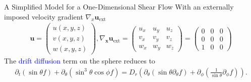 \begin{frame}{A Simplified Model for a One-Dimensional Shear Flow}
	\scriptsize
	With an externally imposed velocity gradient $\nabla_x \boldsymbol{u}_{\mathrm{ext}}$
	\begin{align*}
		\boldsymbol{u}=\left(\begin{array}{l}
			u(x,y,z) \\
			v(x,y,z) \\
			w(x,y,z)
		\end{array}\right),
		\nabla_{\boldsymbol{x}} \boldsymbol{u}_{\mathrm{ext}}=\left(\begin{array}{lll}
			u_{x} & u_{y} & u_{z} \\
			v_{x} & v_{y} & v_{z} \\
			w_{x} & w_{y} & w_{z}
		\end{array}\right)=\left(\begin{array}{ccc}
			0 & 0 & 0 \\
			0 & 0 & 0 \\
			1 & 0 & 0
		\end{array}\right)
	\end{align*}
   The \textcolor{blue}{drift diffusion} term on the sphere reduces to
    \begin{align}
	\partial_{t}\left(\sin \theta f\right)+ \partial_\theta\left( \sin ^3 \theta \cos \phi f\right)
	=D_{r}\left(\partial_\theta \left(\sin \theta \partial_\theta f\right)+ \partial_\phi\left(\frac{1}{\sin \theta} \partial_\phi f\right)\right). \label{smoEq}
    \end{align}
\end{frame}

